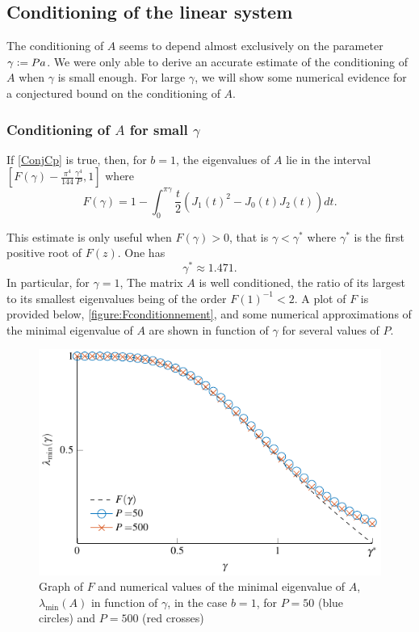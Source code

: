 \documentclass{article}
\begin{document}
\subsection{Conditioning of the linear system}
\newcommand{\Pa}{\gamma}
\newcommand{\Pastar}{\Pa^*}
The conditioning of $A$ seems to depend almost exclusively on the parameter $\Pa \isdef Pa$. We were only able to derive an accurate estimate of the conditioning of $A$ when $\Pa$ is small enough. For large $\Pa$, we will show some numerical evidence for a conjectured bound on the conditioning of $A$.

\subsubsection*{Conditioning of $A$ for small $\Pa$}
\begin{Theorem} If \autoref{ConjCp} is true, then, for $b=1$, the eigenvalues of $A$ lie in the interval~ ${[F(\Pa) - \frac{\pi^4}{144}\frac{\gamma^4}{P},1]}$ where
	\[F(\Pa) = 1 - \int_{0}^{\pi \gamma} \frac{t}{2}(J_1(t)^2 - J_0(t)J_2(t) )dt.\]
	\label{The:lowBoundCon}
\end{Theorem}
This estimate is only useful when ${F(\Pa) > 0}$, that is ${\Pa < \Pastar}$ where $\Pastar$ is the first positive root of $F(z)$. One has 
\[\Pastar \approx 1.471.\]	
In particular, for $\gamma = 1$, The matrix $A$ is well conditioned, the ratio of its largest to its smallest eigenvalues being of the order $F(1)^{-1} < 2$.
A plot of $F$ is provided below, \autoref{figure:Fconditionnement}, and some numerical approximations of the minimal eigenvalue of $A$ are shown in function of $\Pa$ for several values of $P$. 		
\begin{figure}[ht]
	\centering			
	\includegraphics[scale = 1]{Theorem4Fig}
	\caption{Graph of $F$ and numerical values of the minimal eigenvalue of $A$, $\lambda_{\min}(A)$ in function of $\Pa$, in the case $b=1$, for $P=50$ (blue circles) and $P=500$ (red crosses)}
	\label{figure:Fconditionnement}
\end{figure}
\end{document}

